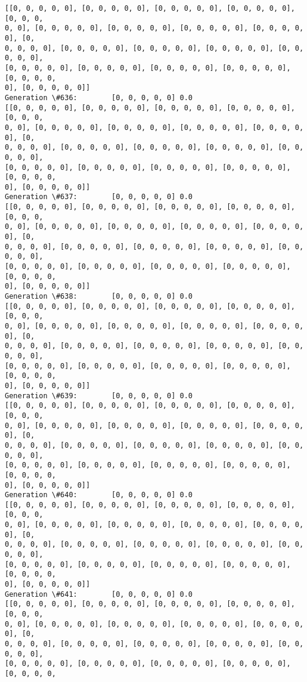 \documentclass[11pt]{article}
\begin{document}
\begin{Verbatim}[commandchars=\\\{\}]
[[0, 0, 0, 0, 0], [0, 0, 0, 0, 0], [0, 0, 0, 0, 0], [0, 0, 0, 0, 0], [0, 0, 0,
0, 0], [0, 0, 0, 0, 0], [0, 0, 0, 0, 0], [0, 0, 0, 0, 0], [0, 0, 0, 0, 0], [0,
0, 0, 0, 0], [0, 0, 0, 0, 0], [0, 0, 0, 0, 0], [0, 0, 0, 0, 0], [0, 0, 0, 0, 0],
[0, 0, 0, 0, 0], [0, 0, 0, 0, 0], [0, 0, 0, 0, 0], [0, 0, 0, 0, 0], [0, 0, 0, 0,
0], [0, 0, 0, 0, 0]]
Generation \#636:        [0, 0, 0, 0, 0] 0.0
[[0, 0, 0, 0, 0], [0, 0, 0, 0, 0], [0, 0, 0, 0, 0], [0, 0, 0, 0, 0], [0, 0, 0,
0, 0], [0, 0, 0, 0, 0], [0, 0, 0, 0, 0], [0, 0, 0, 0, 0], [0, 0, 0, 0, 0], [0,
0, 0, 0, 0], [0, 0, 0, 0, 0], [0, 0, 0, 0, 0], [0, 0, 0, 0, 0], [0, 0, 0, 0, 0],
[0, 0, 0, 0, 0], [0, 0, 0, 0, 0], [0, 0, 0, 0, 0], [0, 0, 0, 0, 0], [0, 0, 0, 0,
0], [0, 0, 0, 0, 0]]
Generation \#637:        [0, 0, 0, 0, 0] 0.0
[[0, 0, 0, 0, 0], [0, 0, 0, 0, 0], [0, 0, 0, 0, 0], [0, 0, 0, 0, 0], [0, 0, 0,
0, 0], [0, 0, 0, 0, 0], [0, 0, 0, 0, 0], [0, 0, 0, 0, 0], [0, 0, 0, 0, 0], [0,
0, 0, 0, 0], [0, 0, 0, 0, 0], [0, 0, 0, 0, 0], [0, 0, 0, 0, 0], [0, 0, 0, 0, 0],
[0, 0, 0, 0, 0], [0, 0, 0, 0, 0], [0, 0, 0, 0, 0], [0, 0, 0, 0, 0], [0, 0, 0, 0,
0], [0, 0, 0, 0, 0]]
Generation \#638:        [0, 0, 0, 0, 0] 0.0
[[0, 0, 0, 0, 0], [0, 0, 0, 0, 0], [0, 0, 0, 0, 0], [0, 0, 0, 0, 0], [0, 0, 0,
0, 0], [0, 0, 0, 0, 0], [0, 0, 0, 0, 0], [0, 0, 0, 0, 0], [0, 0, 0, 0, 0], [0,
0, 0, 0, 0], [0, 0, 0, 0, 0], [0, 0, 0, 0, 0], [0, 0, 0, 0, 0], [0, 0, 0, 0, 0],
[0, 0, 0, 0, 0], [0, 0, 0, 0, 0], [0, 0, 0, 0, 0], [0, 0, 0, 0, 0], [0, 0, 0, 0,
0], [0, 0, 0, 0, 0]]
Generation \#639:        [0, 0, 0, 0, 0] 0.0
[[0, 0, 0, 0, 0], [0, 0, 0, 0, 0], [0, 0, 0, 0, 0], [0, 0, 0, 0, 0], [0, 0, 0,
0, 0], [0, 0, 0, 0, 0], [0, 0, 0, 0, 0], [0, 0, 0, 0, 0], [0, 0, 0, 0, 0], [0,
0, 0, 0, 0], [0, 0, 0, 0, 0], [0, 0, 0, 0, 0], [0, 0, 0, 0, 0], [0, 0, 0, 0, 0],
[0, 0, 0, 0, 0], [0, 0, 0, 0, 0], [0, 0, 0, 0, 0], [0, 0, 0, 0, 0], [0, 0, 0, 0,
0], [0, 0, 0, 0, 0]]
Generation \#640:        [0, 0, 0, 0, 0] 0.0
[[0, 0, 0, 0, 0], [0, 0, 0, 0, 0], [0, 0, 0, 0, 0], [0, 0, 0, 0, 0], [0, 0, 0,
0, 0], [0, 0, 0, 0, 0], [0, 0, 0, 0, 0], [0, 0, 0, 0, 0], [0, 0, 0, 0, 0], [0,
0, 0, 0, 0], [0, 0, 0, 0, 0], [0, 0, 0, 0, 0], [0, 0, 0, 0, 0], [0, 0, 0, 0, 0],
[0, 0, 0, 0, 0], [0, 0, 0, 0, 0], [0, 0, 0, 0, 0], [0, 0, 0, 0, 0], [0, 0, 0, 0,
0], [0, 0, 0, 0, 0]]
Generation \#641:        [0, 0, 0, 0, 0] 0.0
[[0, 0, 0, 0, 0], [0, 0, 0, 0, 0], [0, 0, 0, 0, 0], [0, 0, 0, 0, 0], [0, 0, 0,
0, 0], [0, 0, 0, 0, 0], [0, 0, 0, 0, 0], [0, 0, 0, 0, 0], [0, 0, 0, 0, 0], [0,
0, 0, 0, 0], [0, 0, 0, 0, 0], [0, 0, 0, 0, 0], [0, 0, 0, 0, 0], [0, 0, 0, 0, 0],
[0, 0, 0, 0, 0], [0, 0, 0, 0, 0], [0, 0, 0, 0, 0], [0, 0, 0, 0, 0], [0, 0, 0, 0,

\end{Verbatim}
\end{document}
